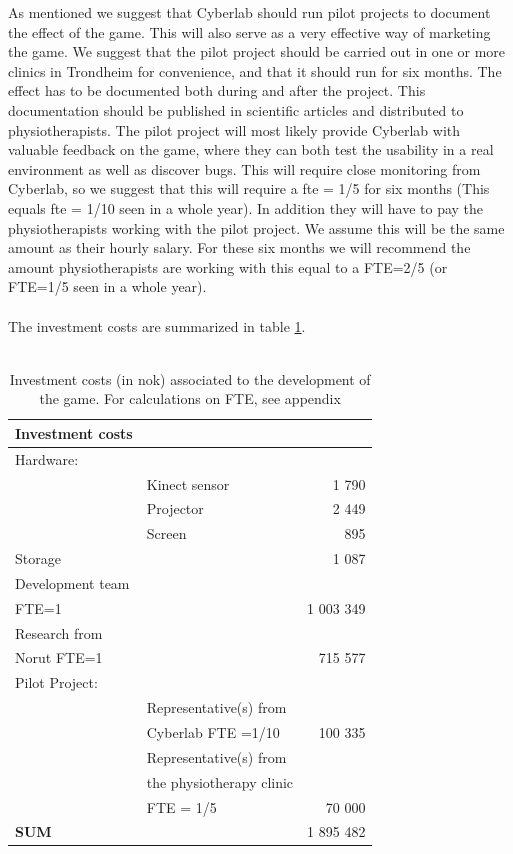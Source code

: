 As mentioned we suggest that Cyberlab should run pilot projects to document the effect of the game. This will also serve as a very effective way of marketing the game. We suggest that the pilot project should be carried out in one or more clinics in Trondheim for convenience, and that it should run for six months. The effect has to be documented both during and after the project. This documentation should be published in scientific articles and distributed to physiotherapists. The pilot project will most likely provide Cyberlab with valuable feedback on the game, where they can both test the usability in a real environment as well as discover bugs. This will require close monitoring from Cyberlab, so we suggest that this will require a \ac{fte} = 1/5 for  six months (This equals \ac{fte} = 1/10 seen in a whole year). In addition they will have to pay the physiotherapists working with the pilot project. We assume this will be the same amount as their hourly salary. For these six months we will recommend the amount physiotherapists are working with this equal to a FTE=2/5 (or FTE=1/5 seen in a whole year).\\ \\
The investment costs are summarized in table \ref{tab:investmentcosts}.\\ \\
\begin{table}
\centering
    \begin{tabular}{|l|l|r|}
        \hline
       \textbf{Investment costs}  & &\\ \hline
       Hardware: & & \\ \hline
	   & Kinect sensor & 1 790  \\ \hline
	   & Projector & 2 449 \\ \hline
	   & Screen & 895 \\ \hline
	   Storage & & 1 087 \\ \hline
	   Development team & & \\  
	   FTE=1 &  & 1 003 349   \\ \hline
	   Research from & & \\ 
	   Norut FTE=1 & & 715 577 \\ \hline
	   Pilot Project: & & \\ \hline
	   & Representative(s) from & \\
	   & Cyberlab FTE =1/10 & 100 335  \\ \hline
	   & Representative(s) from & \\
	   & the physiotherapy clinic & \\
	   & FTE = 1/5 & 70 000  \\ \hline
	   \textbf{SUM} & & 1 895 482 
 \\ \hline
    \end{tabular}
    \caption[Investment costs associated to the development of the game]{Investment costs (in \ac{nok}) associated to the development of the game. For calculations on FTE, see appendix}
    \label{tab:investmentcosts}
\end{table}
